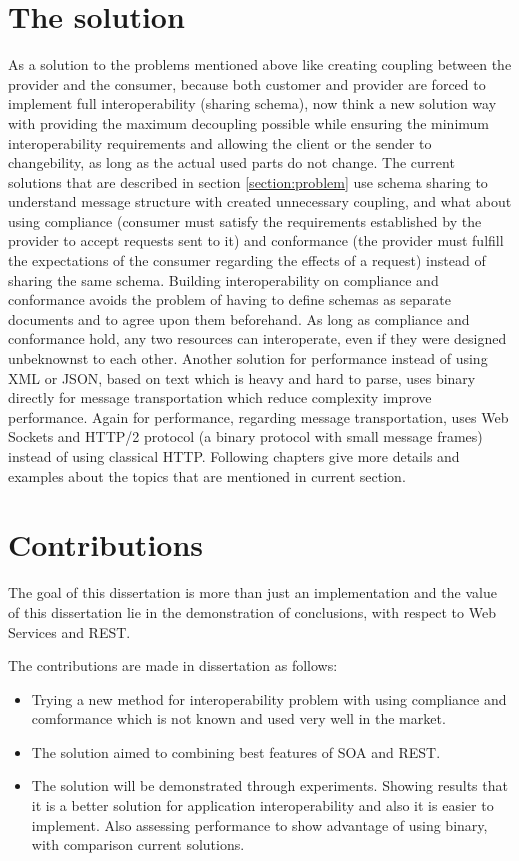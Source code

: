 \section{The solution}
\label{section:solution}

As a solution to the problems mentioned above like creating coupling between the provider and the consumer, because both customer and provider are forced to implement full interoperability (sharing schema), now think a new solution way with providing the maximum decoupling possible while ensuring the minimum interoperability requirements and allowing the client or the sender to changebility, as long as the actual used parts do not change. The current solutions that are described in section \ref{section:problem} use schema sharing to understand message structure with created unnecessary coupling, and what about using compliance (consumer must satisfy the requirements established by the provider to accept requests sent to it)\citep{compliance:def} and conformance (the provider must fulfill the expectations of the consumer regarding the effects of a request)\citep{comformance:def2} instead of sharing the same schema. Building interoperability on compliance and conformance avoids the problem of having to define schemas as separate documents and to agree upon them beforehand. As long as compliance and conformance hold, any two resources can interoperate, even if they were designed unbeknownst to each other. Another solution for performance instead of using XML or JSON, based on text which is heavy and hard to parse, uses binary directly for message transportation which reduce complexity improve performance. Again for performance, regarding message transportation, uses Web Sockets and HTTP/2 protocol (a binary protocol with small message frames) instead of using classical HTTP. Following chapters give more details and examples about the topics that are mentioned in current section.

\section{Contributions}
\label{section:contributions}
The goal of this dissertation is more than just an implementation and the value of this dissertation lie in the demonstration of conclusions, with respect to Web Services and REST.

The contributions are made in dissertation as follows:

\begin{itemize}
  \item Trying a new method for interoperability problem with using compliance and comformance which is not known and used very well in the market.
  \item The solution aimed to combining best features of SOA and REST.
  \item The solution will be demonstrated through experiments. Showing results that it is a better solution for application interoperability and also it is easier to implement. Also assessing performance to show advantage of using binary, with comparison current solutions.
\end{itemize}

